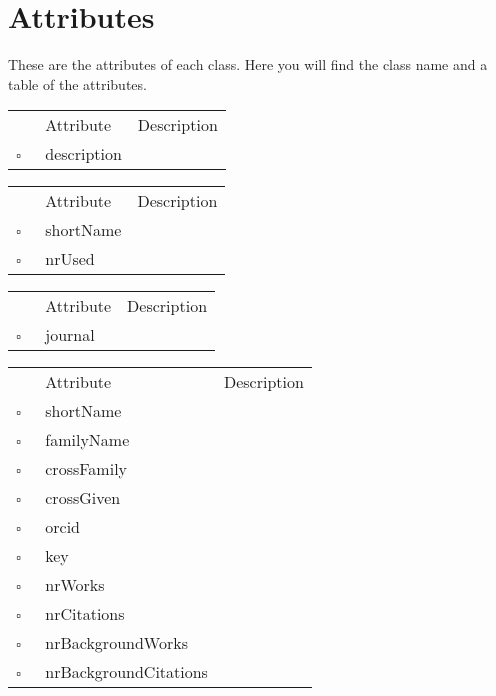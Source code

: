 \chapter{Attributes}
These are the attributes of each class. Here you will find the class name and a table of the attributes.     
\begin{table}
\caption{Acronym  }

\begin{longtable}{llp{8cm}}
& Attribute & Description \\
$\square$\ & description &  \\
\end{longtable}
\label{attr:Acronym}
\end{table}

\clearpage
\begin{table}
\caption{Affiliation  }

\begin{longtable}{llp{8cm}}
& Attribute & Description \\
$\square$\ & shortName &  \\
$\square$\ & nrUsed &  \\
\end{longtable}
\label{attr:Affiliation}
\end{table}

\begin{table}
\caption{Article  }

\begin{longtable}{llp{8cm}}
& Attribute & Description \\
$\square$\ & journal &  \\
\end{longtable}
\label{attr:Article}
\end{table}

\begin{table}
\caption{Author  }

\begin{longtable}{llp{8cm}}
& Attribute & Description \\
$\square$\ & shortName &  \\
$\square$\ & familyName &  \\
$\square$\ & crossFamily &  \\
$\square$\ & crossGiven &  \\
$\square$\ & orcid &  \\
$\square$\ & key &  \\
$\square$\ & nrWorks &  \\
$\square$\ & nrCitations &  \\
$\square$\ & nrBackgroundWorks &  \\
$\square$\ & nrBackgroundCitations &  \\
\end{longtable}
\label{attr:Author}
\end{table}

